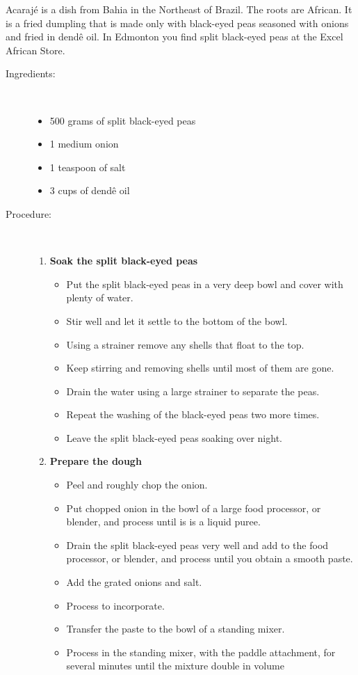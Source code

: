 \documentclass[11pt,letterpaper]{article}
\begin{document}


Acaraj\'e is a dish from Bahia in the Northeast of Brazil. The roots are African. It is a fried dumpling that is made only with black-eyed peas seasoned with onions and fried in dend\^e oil. In Edmonton you find split black-eyed peas at the Excel African Store.

\vspace{0.3in}

\begin{description}

\item[Ingredients:]\ \\
	\begin{itemize}
	\item	500 grams of split black-eyed peas
	\item 1 medium onion 
	\item 1 teaspoon of salt
	\item 3 cups of dend\^e oil  
	\end{itemize}

\item[Procedure:]\ \\

	\begin{enumerate}
	\item {\bf Soak the split black-eyed peas}
	\begin{itemize}
	\item Put the split black-eyed peas in a very deep bowl and cover with plenty of water.
	\item Stir well and let it settle to the bottom of the bowl.
	\item Using a strainer remove any shells that float to the top.
	\item Keep stirring and removing shells until most of them are gone.
	\item Drain the water using a large strainer to separate the peas.
	\item Repeat the washing of the black-eyed peas two more times.
	\item Leave the split black-eyed peas soaking over night.
	\end{itemize}
	
	\item {\bf Prepare the dough}
	\begin{itemize}
	\item Peel and roughly chop the onion.
	\item Put chopped onion in the bowl of a large food processor, or blender, and process until is is a liquid puree.
	\item Drain the split black-eyed peas very well and add to the food processor, or blender, and process until you obtain a smooth paste.
	\item Add the grated onions and salt.
	\item Process to incorporate.
	\item Transfer the paste to the bowl of a standing mixer.
	\item Process in the standing mixer, with the paddle attachment, for several minutes until the mixture double in volume 
	\end{itemize}
	

\end{enumerate}
\end{description}
\end{document}
